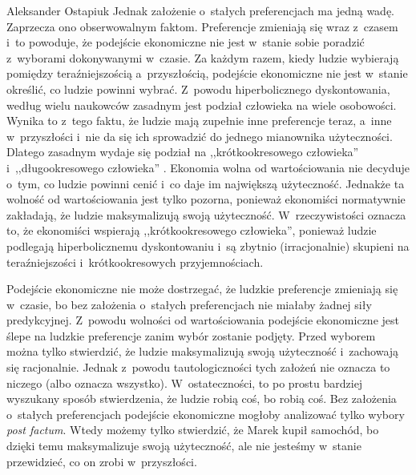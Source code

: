 \begin{artplenv}{Aleksander Ostapiuk}
Jednak założenie o~stałych preferencjach ma jedną wadę. Zaprzecza ono obserwowalnym faktom. Preferencje zmieniają się
wraz z~czasem i~to powoduje, że podejście ekonomiczne nie jest w~stanie sobie poradzić z~wyborami dokonywanymi w~czasie. Za każdym
razem, kiedy ludzie wybierają pomiędzy teraźniejszością a~przyszłością, podejście ekonomiczne nie jest w~stanie
określić, co ludzie powinni wybrać. Z~powodu hiperbolicznego dyskontowania, według wielu naukowców zasadnym jest
podział człowieka na wiele osobowości. Wynika to z~tego faktu, że ludzie mają zupełnie inne preferencje
teraz, a~inne w~przyszłości i~nie da się ich sprowadzić do jednego mianownika użyteczności.
Dlatego zasadnym wydaje się podział na
,,krótkookresowego człowieka'' i~,,długookresowego człowieka''
\parencites{ostapiuk_human_2018}[więcej na temat koncepcji wielu osobowości][]{ainslie_breakdown_2001}{cowen_self-constraint_1991}{davis_theory_2003}%
{elster_multiple_1986}{frederick_time_2002}{fudenberg_dual-self_2006}{heilmann_rationality_2010-1}%
{loewenstein_out_1996}{schelling_intimate_1980,schelling_self-command_1984,schelling_enforcing_1985,schelling_coping_1996}%
{read_which_2006}{strotz_myopia_1955}{thaler_economic_1981}.
Ekonomia wolna od wartościowania nie decyduje o~tym, co ludzie powinni cenić i~co daje im największą
użyteczność. Jednakże ta wolność od wartościowania jest tylko pozorna, ponieważ ekonomiści normatywnie zakładają, że
ludzie maksymalizują swoją użyteczność. W~rzeczywistości oznacza to, że ekonomiści wspierają ,,krótkookresowego
człowieka'', ponieważ ludzie podlegają hiperbolicznemu dyskontowaniu i~są zbytnio (irracjonalnie) skupieni na
teraźniejszości i~krótkookresowych przyjemnościach.

Podejście ekonomiczne nie może dostrzegać, że ludzkie preferencje zmieniają się w~czasie, bo bez
założenia o~stałych preferencjach nie miałaby żadnej siły predykcyjnej. Z~powodu wolności od wartościowania
podejście ekonomiczne jest ślepe na ludzkie preferencje zanim wybór zostanie podjęty. Przed wyborem można
tylko stwierdzić, że ludzie maksymalizują swoją użyteczność i~zachowają się racjonalnie. Jednak z~powodu
tautologiczności tych założeń nie oznacza to niczego (albo oznacza wszystko). W~ostateczności, to po prostu bardziej
wyszukany sposób stwierdzenia, że ludzie robią coś, bo robią coś. Bez założenia o~stałych preferencjach podejście ekonomiczne
mogłoby analizować tylko wybory \textit{post factum}. Wtedy możemy tylko stwierdzić, że Marek kupił
samochód, bo dzięki temu maksymalizuje swoją użyteczność, ale nie jesteśmy w~stanie przewidzieć, co on zrobi w~przyszłości. 


\end{artplenv}
